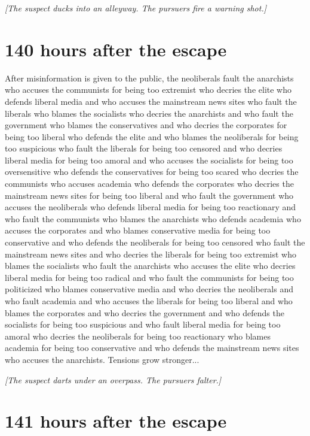 \documentclass{report}
\begin{document}
\textit{[The suspect ducks into an alleyway. The pursuers fire a warning shot.]}


\section*{140 \small{hours after the escape}}

After misinformation is given to the public, the neoliberals fault the anarchists who accuses the communists for being too extremist who decries the elite who defends liberal media and who accuses the mainstream news sites who fault the liberals who blames the socialists who decries the anarchists and who fault the government who blames the conservatives and who decries the corporates for being too liberal who defends the elite and who blames the neoliberals for being too suspicious who fault the liberals for being too censored and who decries liberal media for being too amoral and who accuses the socialists for being too oversensitive who defends the conservatives for being too scared who decries the communists who accuses academia who defends the corporates who decries the mainstream news sites for being too liberal and who fault the government who accuses the neoliberals who defends liberal media for being too reactionary and who fault the communists who blames the anarchists who defends academia who accuses the corporates and who blames conservative media for being too conservative and who defends the neoliberals for being too censored who fault the mainstream news sites and who decries the liberals for being too extremist who blames the socialists who fault the anarchists who accuses the elite who decries liberal media for being too radical and who fault the communists for being too politicized who blames conservative media and who decries the neoliberals and who fault academia and who accuses the liberals for being too liberal and who blames the corporates and who decries the government and who defends the socialists for being too suspicious and who fault liberal media for being too amoral who decries the neoliberals for being too reactionary who blames academia for being too conservative and who defends the mainstream news sites who accuses the anarchists. Tensions grow stronger...

\textit{[The suspect darts under an overpass. The pursuers falter.]}


\section*{141 \small{hours after the escape}}
\end{document}
